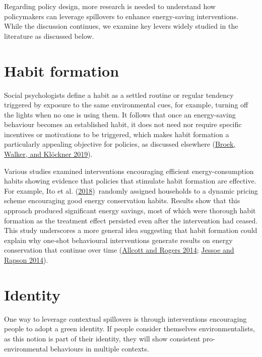 \documentclass[
  11pt,
  captions=heading]{scrreport}
\begin{document}
Regarding policy design, more research is needed to understand how
policymakers can leverage spillovers to enhance energy-saving
interventions. While the discussion continues, we examine key levers
widely studied in the literature as discussed below.

\hypertarget{habit-formation}{%
\section{Habit formation}\label{habit-formation}}

Social psychologists define a habit as a settled routine or regular
tendency triggered by exposure to the same environmental cues, for
example, turning off the lights when no one is using them. It follows
that once an energy-saving behaviour becomes an established habit, it
does not need nor require specific incentives or motivations to be
triggered, which makes habit formation a particularly appealing
objective for policies, as discussed elsewhere
(\protect\hyperlink{ref-van2019drivers}{Broek, Walker, and Klöckner
2019}).

Various studies examined interventions encouraging efficient
energy-consumption habits showing evidence that policies that stimulate
habit formation are effective. For example, Ito et al.
(\protect\hyperlink{ref-ito2018moral}{2018})~randomly assigned
households to a dynamic pricing scheme encouraging good energy
conservation habits. Results show that this approach produced
significant energy savings, most of which were thorough habit formation
as the treatment effect persisted even after the intervention had
ceased. This study underscores a more general idea suggesting that habit
formation could explain why one-shot behavioural interventions generate
results on energy conservation that continue over time
(\protect\hyperlink{ref-allcott2014short}{Allcott and Rogers 2014};
\protect\hyperlink{ref-jessoe2014knowledge}{Jessoe and Rapson 2014}).

\hypertarget{identity}{%
\section{Identity}\label{identity}}

One way to leverage contextual spillovers is through interventions
encouraging people to adopt a green identity. If people consider
themselves environmentalists, as this notion is part of their identity,
they will show consistent pro-environmental behaviours in multiple
contexts.
\end{document}
